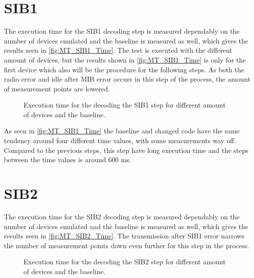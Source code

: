 \section{SIB1}
The execution time for the SIB1 decoding step is measured dependably on the number of devices emulated and the baseline is measured as well, which gives the results seen in \autoref{fig:MT_SIB1_Time}. The test is executed with the different amount of devices, but the results shown in \autoref{fig:MT_SIB1_Time} is only for the first device which also will be the procedure for the following steps.  As both the radio error and idle after MIB error occurs in this step of the process, the amount of measurement points are lowered. 

\begin{figure}[H]
\centering
\resizebox{0.5\textwidth}{!}{
}
\caption{Execution time for the decoding the SIB1 step for different amount of devices and the baseline.}
\label{fig:MT_SIB1_Time}
\end{figure}

As seen in \autoref{fig:MT_SIB1_Time} the baseline and changed code have the same tendency around four different time values, with some measurements way off. Compared to the previous steps, this step have long execution time and the steps between the time values is around 600 ms.

\section{SIB2}
The execution time for the SIB2 decoding step is measured dependably on the number of devices emulated and the baseline is measured as well, which gives the results seen in \autoref{fig:MT_SIB2_Time}. The transmission after SIB1 error narrows the number of measurement points down even further for this step in the process.

\begin{figure}[H]
\centering
\resizebox{0.5\textwidth}{!}{
}
\caption{Execution time for the decoding the SIB2 step for different amount of devices and the baseline.}
\label{fig:MT_SIB2_Time}
\end{figure}

